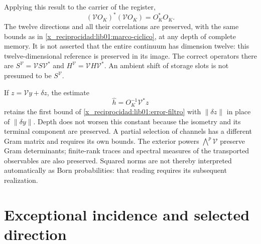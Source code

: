 Applying this result to the carrier of the register,
\begin{equation}
 (\mathcal VO_K)^*(\mathcal VO_K)=O_K^*O_K.
 \label{x_reciprocidad:lib01:gram-memoria}
\end{equation}
The twelve directions and all their correlations are preserved, with the same bounds as in \cref{x_reciprocidad:lib01:marco-ciclico}, at any depth of complete memory. It is not asserted that the entire continuum has dimension twelve: this twelve-dimensional reference is preserved in its image. The correct operators there are \(S^{\mathcal V}=\mathcal VS\mathcal V^*\) and \(H^{\mathcal V}=\mathcal VH\mathcal V^*\). An ambient shift of storage slots is not presumed to be \(S^{\mathcal V}\).

If \(z=\mathcal Vy+\delta z\), the estimate
\[
 \widehat h=O_K^{-1}\mathcal V^*z
\]
retains the first bound of \eqref{x_reciprocidad:lib01:error-filtro} with \(\|\delta z\|\) in place of \(\|\delta y\|\). Depth does not worsen this constant because the isometry and its terminal component are preserved. A partial selection of channels has a different Gram matrix and requires its own bounds. The exterior powers \(\bigwedge^p\mathcal V\) preserve Gram determinants; finite-rank traces and spectral measures of the transported observables are also preserved. Squared norms are not thereby interpreted automatically as Born probabilities: that reading requires its subsequent realization.

\section{Exceptional incidence and selected direction}
\label{x_reciprocidad:lib01:direccion}

